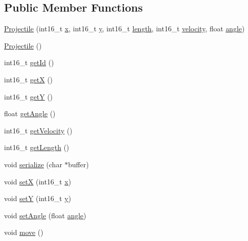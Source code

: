 \subsection*{Public Member Functions}
\begin{DoxyCompactItemize}
\item 
\hyperlink{class_projectile_a309d73855dcfacee8421900c4f5e4411}{Projectile} (int16\+\_\+t \hyperlink{class_projectile_a706363cbafcbe19aa68853b2821e63b5}{x}, int16\+\_\+t \hyperlink{class_projectile_a19d3eab0725a2679d39c6d316e3681ca}{y}, int16\+\_\+t \hyperlink{class_projectile_a123f18a0665fd6ae48dcbd900647defb}{length}, int16\+\_\+t \hyperlink{class_projectile_a0f40006b298e765555e5494f3bbdc929}{velocity}, float \hyperlink{class_projectile_a5c3f2c4e44bd0607dbdb55ebfb86f88b}{angle})
\item 
\hyperlink{class_projectile_ac536ed2aad56af866a2078b9a85aa16d}{Projectile} ()
\item 
int16\+\_\+t \hyperlink{class_projectile_a359ade45d958b4817e63fc06b25f55af}{get\+Id} ()
\item 
int16\+\_\+t \hyperlink{class_projectile_a274d46f885207253588d74f54ddb674d}{get\+X} ()
\item 
int16\+\_\+t \hyperlink{class_projectile_a3c5e30132bd9d414514c682e447ef0de}{get\+Y} ()
\item 
float \hyperlink{class_projectile_a58707185f143d76efe3cfcec799a7ea5}{get\+Angle} ()
\item 
int16\+\_\+t \hyperlink{class_projectile_a0417e5c4b9fca6aae57844c57bd78fc0}{get\+Velocity} ()
\item 
int16\+\_\+t \hyperlink{class_projectile_aa75120b722b0078d78e9d8416c0325a7}{get\+Length} ()
\item 
void \hyperlink{class_projectile_a30ea63ab82a2dc401b8145f61310a9ae}{serialize} (char $\ast$buffer)
\item 
void \hyperlink{class_projectile_a0ed37ed97cd4b930da3f7bffbc5e3aa6}{set\+X} (int16\+\_\+t \hyperlink{class_projectile_a706363cbafcbe19aa68853b2821e63b5}{x})
\item 
void \hyperlink{class_projectile_a11e50cf592b5db73cf90a1f18ec5fe1b}{set\+Y} (int16\+\_\+t \hyperlink{class_projectile_a19d3eab0725a2679d39c6d316e3681ca}{y})
\item 
void \hyperlink{class_projectile_a5bf8e186023fb20ec8c15476c894def2}{set\+Angle} (float \hyperlink{class_projectile_a5c3f2c4e44bd0607dbdb55ebfb86f88b}{angle})
\item 
void \hyperlink{class_projectile_ac5f6d2a73c1f82f2f11ae353d251acef}{move} ()
\end{DoxyCompactItemize}
